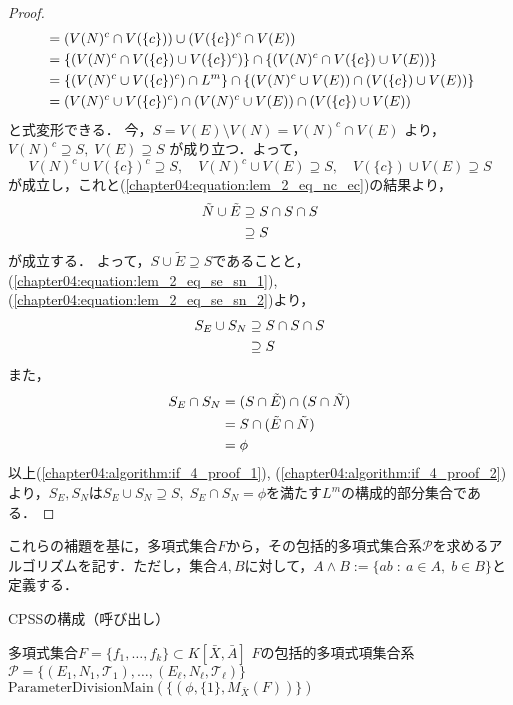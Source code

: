 \begin{proof}
\begin{align}
		&= (V(N)^c \cap V(\{ c \})) \cup (V(\{ c \})^c \cap V(E)) \notag \\
		&= \{ (V(N)^c \cap V(\{ c \}) \cup V(\{c\})^c) \} \cap \{ (V(N)^c \cap V(\{ c \}) \cup V(E)) \} \notag \\
		&= \{ (V(N)^c \cup V(\{c\})^c) \cap L^m\} \cap \{ (V(N)^c \cup V(E)) \cap (V(\{c\}) \cup V(E)) \} \notag \\
		&= (V(N)^c \cup V(\{c\})^c) \cap (V(N)^c \cup V(E)) \cap (V(\{c\}) \cup V(E)) \label{chapter04:equation:lem_2_eq_nc_ec}
	\end{align}
	と式変形できる．
	今，$S = V(E) \setminus V(N) = V(N)^c \cap V(E)$
	より，
	$V(N)^c \supseteq S, \; V(E) \supseteq S$
	が成り立つ．よって，
	$$V(N)^c \cup V(\{c\})^c \supseteq S, \quad V(N)^c \cup V(E) \supseteq S, \quad V(\{c\}) \cup V(E) \supseteq S$$
	が成立し，これと(\ref{chapter04:equation:lem_2_eq_nc_ec})の結果より，
	\begin{align}
		\tilde{N} \cup \tilde{E} &\supseteq S \cap S \cap S \notag\\
		&\supseteq S \label{chapter04:equation:lem_2_eq_se_sn_2}
	\end{align}
	が成立する．
	よって，$S \cup \tilde{E} \supseteq S$であることと，(\ref{chapter04:equation:lem_2_eq_se_sn_1}), (\ref{chapter04:equation:lem_2_eq_se_sn_2})より，
	\begin{align}
		S_E \cup S_N &\supseteq S \cap S \cap S \notag\\
		&\supseteq S \label{chapter04:algorithm:if_4_proof_1}
	\end{align}
	また，
	\begin{align}
		S_E \cap S_N &= (S \cap \tilde{E}) \cap (S \cap \tilde{N}) \notag \\
		&= S \cap (\tilde{E} \cap \tilde{N}) \notag \\
		&= \phi \label{chapter04:algorithm:if_4_proof_2}
	\end{align}
	以上(\ref{chapter04:algorithm:if_4_proof_1}), (\ref{chapter04:algorithm:if_4_proof_2})より，$S_E, S_N$は$S_E \cup S_N \supseteq S,\; S_E \cap S_N = \phi$を満たす$L^m$の構成的部分集合である．
\end{proof}

これらの補題を基に，多項式集合$F$から，その包括的多項式集合系$\mathcal{P}$を求めるアルゴリズムを記す．ただし，集合$A, B$に対して，$A \land B := \{ ab \; : \: a \in A, \; b \in B \}$と定義する．

\begin{algorithm}[htbp]
\caption{CPSSの構成（呼び出し）}
\label{chapter04:algorithm:PD_alg_num}
\begin{algorithmic}[1]
\Require 多項式集合$F=\{ f_1, \dots, f_k \} \subset K[\bar{X}, \bar{A}]$
\Ensure $F$の包括的多項式項集合系$\mathcal{P}=\{ (E_1, N_1, \mathscr{T}_1), \dots, (E_\ell, N_\ell, \mathscr{T}_\ell) \}$
	\State \Return $ \mathrm{ParameterDivisionMain}(\{(\phi, \{ 1 \}, M_{\bar{X}}(F))\})$
\EndFunction
\end{algorithmic}
\end{algorithm}

